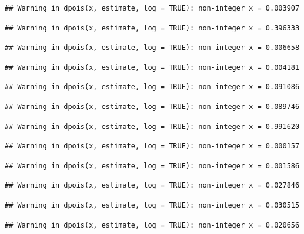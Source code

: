 \documentclass[]{article}
\begin{document}
\begin{verbatim}
## Warning in dpois(x, estimate, log = TRUE): non-integer x = 0.003907
\end{verbatim}

\begin{verbatim}
## Warning in dpois(x, estimate, log = TRUE): non-integer x = 0.396333
\end{verbatim}

\begin{verbatim}
## Warning in dpois(x, estimate, log = TRUE): non-integer x = 0.006658
\end{verbatim}

\begin{verbatim}
## Warning in dpois(x, estimate, log = TRUE): non-integer x = 0.004181
\end{verbatim}

\begin{verbatim}
## Warning in dpois(x, estimate, log = TRUE): non-integer x = 0.091086
\end{verbatim}

\begin{verbatim}
## Warning in dpois(x, estimate, log = TRUE): non-integer x = 0.089746
\end{verbatim}

\begin{verbatim}
## Warning in dpois(x, estimate, log = TRUE): non-integer x = 0.991620
\end{verbatim}

\begin{verbatim}
## Warning in dpois(x, estimate, log = TRUE): non-integer x = 0.000157
\end{verbatim}

\begin{verbatim}
## Warning in dpois(x, estimate, log = TRUE): non-integer x = 0.001586
\end{verbatim}

\begin{verbatim}
## Warning in dpois(x, estimate, log = TRUE): non-integer x = 0.027846
\end{verbatim}

\begin{verbatim}
## Warning in dpois(x, estimate, log = TRUE): non-integer x = 0.030515
\end{verbatim}

\begin{verbatim}
## Warning in dpois(x, estimate, log = TRUE): non-integer x = 0.020656
\end{verbatim}
\end{document}
